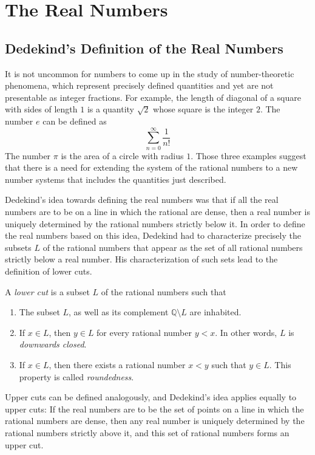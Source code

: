 \chapter{The Real Numbers}

\section{Dedekind's Definition of the Real Numbers}

It is not uncommon for numbers to come up in the study of number-theoretic phenomena, which represent precisely defined quantities and yet are not presentable as integer fractions. For example, the length of diagonal of a square with sides of length $1$ is a quantity $\sqrt{2}$ whose square is the integer $2$. The number $e$ can be defined as
\begin{equation*}
  \sum_{n=0}^\infty \frac{1}{n!}
\end{equation*}
The number $\pi$ is the area of a circle with radius $1$. Those three examples suggest that there is a need for extending the system of the rational numbers to a new number systems that includes the quantities just described.

Dedekind's idea towards defining the real numbers was that if all the real numbers are to be on a line in which the rational are dense, then a real number is uniquely determined by the rational numbers strictly below it. In order to define the real numbers based on this idea, Dedekind had to characterize precisely the subsets $L$ of the rational numbers that appear as the set of all rational numbers strictly below a real number. His characterization of such sets lead to the definition of lower cuts.

\begin{definition}
  A \emph{lower cut} is a subset $L$ of the rational numbers such that
  \begin{enumerate}
  \item The subset $L$, as well as its complement $\mathbb{Q}\setminus L$ are inhabited.
  \item If $x\in L$, then $y\in L$ for every rational number $y<x$. In other words, $L$ is \emph{downwards closed}.
  \item If $x\in L$, then there exists a rational number $x<y$ such that $y\in L$. This property is called \emph{roundedness}.
  \end{enumerate}
\end{definition}

Upper cuts can be defined analogously, and Dedekind's idea applies equally to upper cuts: If the real numbers are to be the set of points on a line in which the rational numbers are dense, then any real number is uniquely determined by the rational numbers strictly above it, and this set of rational numbers forms an upper cut.

